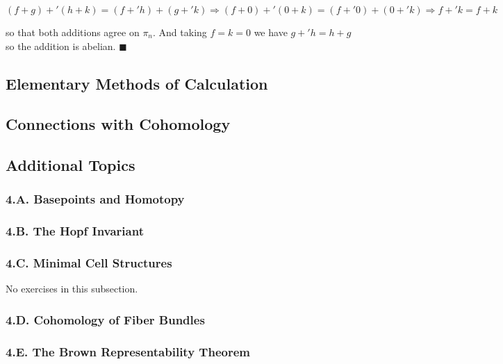 \documentclass{article}
\begin{document}
$$(f+g)+'(h+k) = (f+'h)+(g+'k)\Longrightarrow (f+0)+'(0+k) = (f+'0)+(0+'k)\Longrightarrow f+'k = f+k$$

so that both additions agree on $\pi_{n}$. And taking $f = k = 0$ we have $g +' h = h + g$ so the addition is abelian. $\blacksquare$
\bigskip
\bigskip

\subsection{Elementary Methods of Calculation}

\subsection{Connections with Cohomology}

\subsection*{Additional Topics}

\subsubsection*{4.A. Basepoints and Homotopy}

\subsubsection*{4.B. The Hopf Invariant}

\subsubsection*{4.C. Minimal Cell Structures}

\tab No exercises in this subsection.
\bigskip
\bigskip

\subsubsection*{4.D. Cohomology of Fiber Bundles}

\subsubsection*{4.E. The Brown Representability Theorem}
\end{document}
